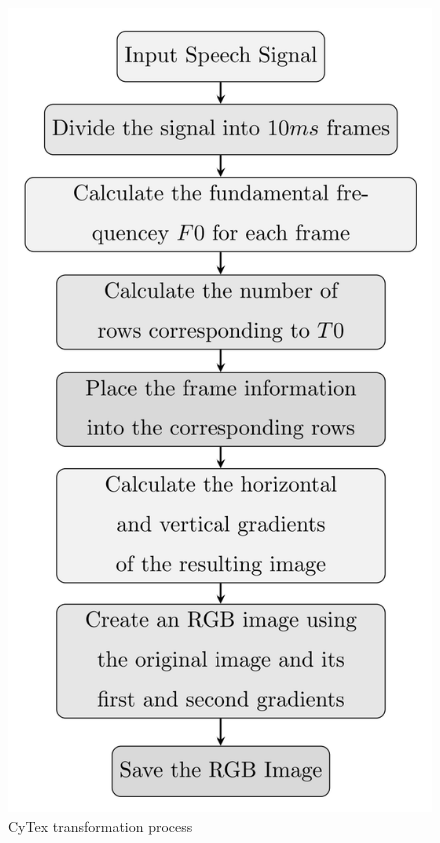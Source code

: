 \begin{figure}
        \centering
        \includegraphics[scale = 0.8]{images/CyTex Procedure Flowchart.png}
        \caption{CyTex transformation process \cite{CyTexRef}}
        \label{cytexFlowchart}
\end{figure}
